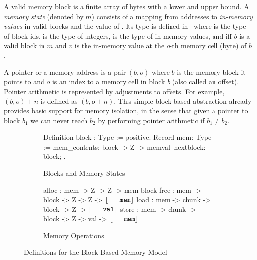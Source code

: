 A valid memory block is a
finite array of bytes with a lower and upper bound. A \emph{memory
state} (denoted by $m$) consists of a mapping from addresses to
\emph{in-memory values} in valid blocks and the value of
\nextblock. Its type  is defined in~
where  is the type of block ids,  is the type of
integers,  is the type of in-memory values, and
 iff $b$ is a valid block in
$m$ and $v$ is the in-memory value at the $o$-th memory cell (byte) of
$b$.

A pointer or a memory address is a pair $(b, o)$ where $b$ is the
memory block it points to and $o$ is an index to a memory cell in block
$b$ (also called an offset).
%
Pointer arithmetic is represented by adjustments to offsets. For
example, $(b, o) + n$ is defined as $(b, o+n)$.
%
This simple block-based abstraction already provides basic support for
memory isolation, in the sense that given a pointer to block $b_1$ we
can never reach $b_2$ by performing pointer arithmetic if $b_1 \neq b_2$.

\begin{figure}
  \begin{subfigure}[b]{.45\textwidth}
    \begin{coq}
Definition block : Type := positive.
Record mem: Type := { 
  mem_contents: block -> Z -> memval;
  nextblock: block; }.
    \end{coq}
    \caption{Blocks and Memory States}
    \label{sfig:memstate}
  \end{subfigure}
  \begin{subfigure}[b]{.5\textwidth}  
    \begin{coq}
alloc : mem -> Z -> Z -> mem \times block
free  : mem -> block -> Z -> Z -> $\some{\code{mem}}$
load  : mem -> chunk -> block -> Z -> $\some{\code{val}}$
store : mem -> chunk -> block -> Z -> val -> $\some{\code{mem}}$
    \end{coq}
    \caption{Memory Operations}
    \label{sfig:memops}
  \end{subfigure}
  \caption{Definitions for the Block-Based Memory Model}
  \label{fig:bbmem}
\end{figure}


